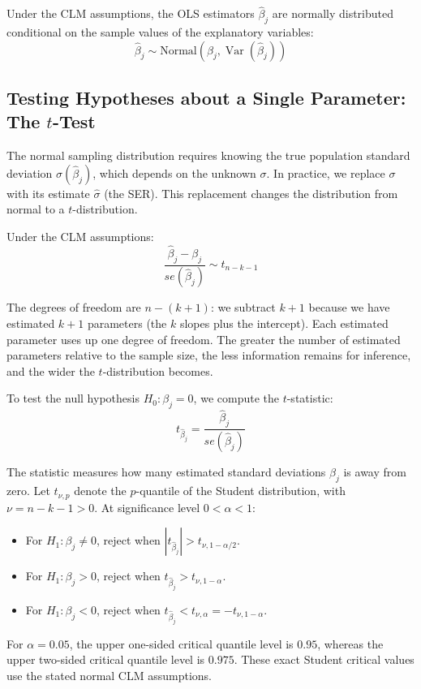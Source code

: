 \begin{theorem}
Under the CLM assumptions, the OLS estimators $\hat{\beta}_j$ are normally distributed conditional on the sample values of the explanatory variables:
$$\hat{\beta}_j \sim \text{Normal}\left(\beta_j, \operatorname{Var}(\hat{\beta}_j)\right)$$
\end{theorem}
\subsection{Testing Hypotheses about a Single Parameter: The \texorpdfstring{$t$}{t}-Test}

The normal sampling distribution requires knowing the true population standard deviation $\sigma(\hat{\beta}_j)$, which depends on the unknown $\sigma$. In practice, we replace $\sigma$ with its estimate $\hat{\sigma}$ (the SER). This replacement changes the distribution from normal to a $t$-distribution.

\begin{theorem}
Under the CLM assumptions:
$$\frac{\hat{\beta}_j - \beta_j}{se(\hat{\beta}_j)} \sim t_{n-k-1}$$
\end{theorem}

The degrees of freedom are $n - (k+1)$: we subtract $k+1$ because we have estimated $k+1$ parameters (the $k$ slopes plus the intercept). Each estimated parameter uses up one degree of freedom. The greater the number of estimated parameters relative to the sample size, the less information remains for inference, and the wider the $t$-distribution becomes.

To test the null hypothesis $H_0: \beta_j = 0$, we compute the $t$-statistic:
$$t_{\hat{\beta}_j} = \frac{\hat{\beta}_j}{se(\hat{\beta}_j)}$$

The statistic measures how many estimated standard deviations $\hat\beta_j$
is away from zero.
Let $t_{\nu,p}$ denote the $p$-quantile of the Student distribution,
with $\nu=n-k-1>0$. At significance level $0<\alpha<1$:
\begin{itemize}
\item For $H_1:\beta_j\ne0$, reject when
$|t_{\hat\beta_j}|>t_{\nu,1-\alpha/2}$.
\item For $H_1:\beta_j>0$, reject when
$t_{\hat\beta_j}>t_{\nu,1-\alpha}$.
\item For $H_1:\beta_j<0$, reject when
$t_{\hat\beta_j}<t_{\nu,\alpha}=-t_{\nu,1-\alpha}$.
\end{itemize}
For $\alpha=0.05$, the upper one-sided critical quantile level is $0.95$,
whereas the upper two-sided critical quantile level is $0.975$. These exact
Student critical values use the stated normal CLM assumptions.

